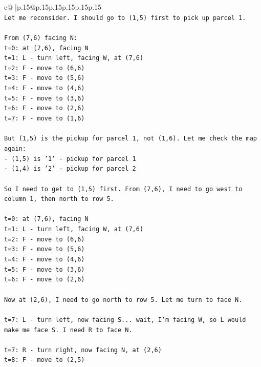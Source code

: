 \documentclass{article}
\begin{document}
{\begin{supertabular}{c@{$\;$}|p{.15\linewidth}@{}p{.15\linewidth}p{.15\linewidth}p{.15\linewidth}p{.15\linewidth}p{.15\linewidth}}
{{{\\ 
\texttt{Let me reconsider. I should go to (1,5) first to pick up parcel 1.} \\
\\ 
\texttt{From (7,6) facing N:} \\
\texttt{t=0: at (7,6), facing N} \\
\texttt{t=1: L {-} turn left, facing W, at (7,6)} \\
\texttt{t=2: F {-} move to (6,6)} \\
\texttt{t=3: F {-} move to (5,6)} \\
\texttt{t=4: F {-} move to (4,6)} \\
\texttt{t=5: F {-} move to (3,6)} \\
\texttt{t=6: F {-} move to (2,6)} \\
\texttt{t=7: F {-} move to (1,6)} \\
\\ 
\texttt{But (1,5) is the pickup for parcel 1, not (1,6). Let me check the map again:} \\
\texttt{{-} (1,5) is '1' {-} pickup for parcel 1} \\
\texttt{{-} (1,4) is '2' {-} pickup for parcel 2} \\
\\ 
\texttt{So I need to get to (1,5) first. From (7,6), I need to go west to column 1, then north to row 5.} \\
\\ 
\texttt{t=0: at (7,6), facing N} \\
\texttt{t=1: L {-} turn left, facing W, at (7,6)} \\
\texttt{t=2: F {-} move to (6,6)} \\
\texttt{t=3: F {-} move to (5,6)} \\
\texttt{t=4: F {-} move to (4,6)} \\
\texttt{t=5: F {-} move to (3,6)} \\
\texttt{t=6: F {-} move to (2,6)} \\
\\ 
\texttt{Now at (2,6), I need to go north to row 5. Let me turn to face N.} \\
\\ 
\texttt{t=7: L {-} turn left, now facing S... wait, I'm facing W, so L would make me face S. I need R to face N.} \\
\\ 
\texttt{t=7: R {-} turn right, now facing N, at (2,6)} \\
\texttt{t=8: F {-} move to (2,5)} \\
}}}
\end{supertabular}}
\end{document}
